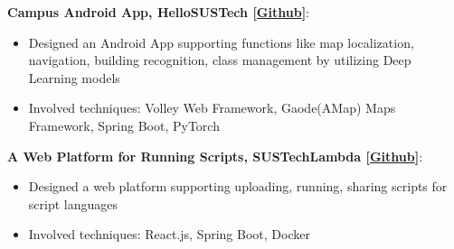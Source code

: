 \documentclass[letterpaper,11pt]{article}
\newcommand{\resumeItem}[2]{
  \item\small{
    \textbf{#1}{: #2 \vspace{-2pt}}
  }
}
\newcommand{\resumeSubItem}[2]{\resumeItem{#1}{#2}\vspace{-4pt}}
\begin{document}
  \resumeSubItem
      {Campus Android App, HelloSUSTech [\href{https://github.com/RainyTong/Hello-SUSTech}{Github}]}{}
       \begin{itemize}
       \item Designed an Android App supporting functions like map localization, navigation, building recognition, class management by utilizing Deep Learning models 
       \item Involved techniques: Volley Web Framework, Gaode(AMap) Maps Framework, Spring Boot, PyTorch
       \end{itemize}
       
   \resumeSubItem
      {A Web Platform for Running Scripts, SUSTechLambda [\href{https://github.com/Henrycobaltech/SUSTechLambda}{Github}]}{}
       \begin{itemize}
       \item Designed a web platform supporting uploading, running, sharing scripts for script languages
       \item Involved techniques: React.js, Spring Boot, Docker
       \end{itemize}
       
   
       
      
      
      
  
  
\end{document}
